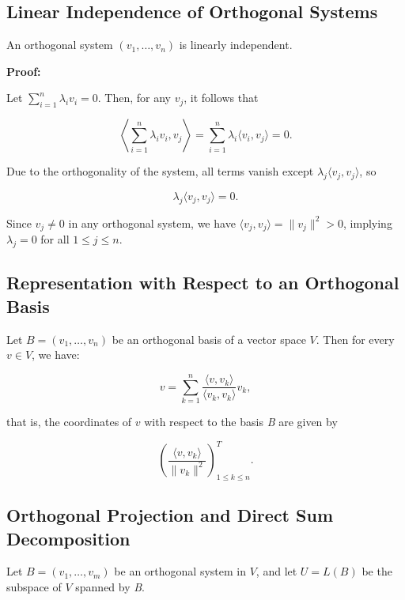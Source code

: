 \subsection{Linear Independence of Orthogonal Systems}

An orthogonal system \( (v_1, \ldots, v_n) \) is linearly independent.
\vspace{\baselineskip}

\textbf{Proof:} 

Let \( \sum_{i=1}^n \lambda_i v_i = 0 \). Then, for any \( v_j \), it follows that

\[
    \left\langle \sum_{i=1}^n \lambda_i v_i, v_j \right\rangle = \sum_{i=1}^n \lambda_i \langle v_i, v_j 
    \rangle = 0.
\]

Due to the orthogonality of the system, all terms vanish except \( \lambda_j \langle v_j, v_j \rangle \), 
so

\[
    \lambda_j \langle v_j, v_j \rangle = 0.
\]

Since \( v_j \neq 0 \) in any orthogonal system, we have \( \langle v_j, v_j \rangle = \|v_j\|^2 > 0 \), 
implying \( \lambda_j = 0 \) for all \( 1 \leq j \leq n \).

\QED

\subsection{Representation with Respect to an Orthogonal Basis}

Let \( B = (v_1, \ldots, v_n) \) be an orthogonal basis of a vector space \( V \). Then for every 
\( v \in V \), we have:

\[
    v = \sum_{k=1}^n \frac{\langle v, v_k \rangle}{\langle v_k, v_k \rangle} v_k,
\]

that is, the coordinates of \( v \) with respect to the basis \emph{B} are given by

\[
    \left( \frac{\langle v, v_k \rangle}{\|v_k\|^2} \right)_{1 \leq k \leq n}^T.
\]


\subsection{Orthogonal Projection and Direct Sum Decomposition}

Let \( B = (v_1, \ldots, v_m) \) be an orthogonal system in \( V \), and let \( U = L(B) \) be the 
subspace of \( V \) spanned by \emph{B}.

